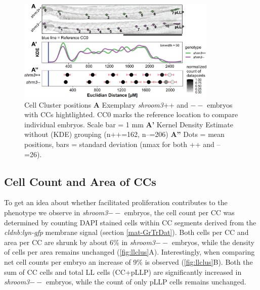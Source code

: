 \documentclass[11pt,singlespacinge,twoside]{reedthesis} %
\begin{document}
\begin{figure}

{\centering \includegraphics[width=0.85\textwidth]{figures/results/01_morphometrics/ll_positions} 

}

\caption[Cell Cluster Positions]{Cell Cluster positions \textbf{A} Exemplary \emph{shroom3}++ and \(--\) embryos with CCs hightlighted. CC0 marks the reference location to compare individual embryos. Scale bar = 1 mm \textbf{A'} Kernel Density Estimate without (KDE) grouping (n++=162, n--=206) \textbf{A''} Dots = mean positions, bars = standard deviation (nmax for both ++ and -- =26).}\label{fig:llpos}
\end{figure}
\hypertarget{cell-count-and-area-of-ccs}{%
\subsection{Cell Count and Area of CCs}\label{cell-count-and-area-of-ccs}}

To get an idea about whether facilitated proliferation contributes to the phenotype we observe in \emph{shroom3}\(--\) embryos, the cell count per CC was determined by counting DAPI stained cells within CC segments derived from the \emph{cldnb:lyn-gfp} membrane signal (section \ref{mat-GrTrDat}). Both cells per CC and area per CC are shrunk by about 6\% in \emph{shroom3}\(--\) embryos, while the density of cells per area remains unchanged (\ref{fig:llclus}A). Interestingly, when comparing net cell counts per embryo an increase of 9\% is observed (\ref{fig:llclus}B). Both the sum of CC cells and total LL cells (CC+pLLP) are significantly increased in \emph{shroom3}\(--\) embryos, while the count of only pLLP cells remains unchanged.
\end{document}
